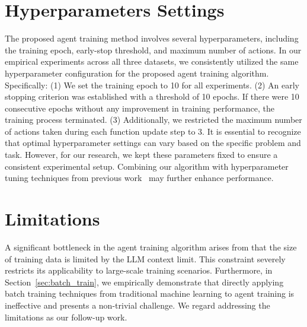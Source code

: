 \documentclass{article}
\theoremstyle{plain}
\theoremstyle{definition}
\theoremstyle{remark}
\begin{document}
\section{Hyperparameters Settings}
The proposed agent training method involves several hyperparameters, including the training epoch, early-stop threshold, and maximum number of actions.
In our empirical experiments across all three datasets, we consistently utilized the same hyperparameter configuration for the proposed agent training algorithm. Specifically:
(1) We set the training epoch to 10 for all experiments.
(2) An early stopping criterion was established with a threshold of 10 epochs. If there were 10 consecutive epochs without any improvement in training performance, the training process terminated.
(3) Additionally, we restricted the maximum number of actions taken during each function update step to 3.
It is essential to recognize that optimal hyperparameter settings can vary based on the specific problem and task. However, for our research, we kept these parameters fixed to ensure a consistent experimental setup. 
Combining our algorithm with hyperparameter tuning techniques from previous work~\cite{li2018hyperband, wu2021frugal, zhang2022targeted} may further enhance performance.

\section{Limitations}

A significant bottleneck in the agent training algorithm arises from that the size of training data is limited by the LLM context limit.
This constraint severely restricts its applicability to large-scale training scenarios.
Furthermore, in Section~\ref{sec:batch_train}, we empirically demonstrate that directly applying batch training techniques from traditional machine learning to agent training is ineffective and presents a non-trivial challenge. We regard addressing the limitations as our follow-up work.
\end{document}
